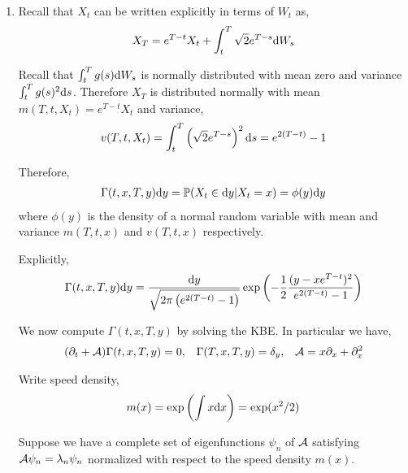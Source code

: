 \begin{solution}[Solution]
\begin{enumerate}[label=(\alph*)]
    \item Recall that \( X_t \) can be written explicitly in terms of \( W_t \) as,
        \begin{align*}
            X_T = e^{T-t} X_t + \int_t^T \sqrt{2}e^{T-s} \d W_s %
        \end{align*}

        
        Recall that \( \int_t^T g(s)\mathrm{d} W_s \) is normally distributed with mean zero and variance \( \int_t^T g(s)^2 \mathrm{d} s \).
        Therefore \( X_T \) is distributed normally with mean \( m(T,t,X_t) = e^{T-t}X_t \) and variance,
        \begin{align*}
            v(T,t,X_t) = \int_t^T \left( \sqrt{2} e^{T-s} \right)^2\mathrm{d} s = e^{2(T-t)}-1
        \end{align*}
        

        Therefore,
        \begin{align*}
            \Gamma(t,x,T,y)\mathrm{d} y = \mathbb{P}(X_t\in\mathrm{d} y | X_t = x) = \phi(y)\mathrm{d} y
        \end{align*}
        where \( \phi(y) \) is the density of a normal random variable with mean and variance \( m(T,t,x) \) and \( v(T,t,x) \) respectively.
        
        Explicitly,
        \begin{align*}
            \Gamma(t,x,T,y)\mathrm{d} y = \frac{\mathrm{d} y}{ \sqrt{2\pi\left( e^{2(T-t)}-1 \right)}} \exp \left( - \frac{1}{2} \frac{ (y-xe^{T-t})^2}{ e^{2(T-t)}-1}  \right)
        \end{align*}
        
        \hrulefill

        We now compute \( \Gamma(t,x,T,y) \) by solving the KBE. In particular we have,
        \begin{align*}
            (\partial_t + \mathcal{A}) \Gamma(t,x,T,y) = 0, && \Gamma(T,x,T,y) = \delta_y, && \mathcal{A} = x\partial_x + \partial_x^2
        \end{align*}

        Write speed density,
        \begin{align*}
            m(x) = \exp \left( \int x \mathrm{d} x \right) = \exp(x^2/2)
        \end{align*}
        

        Suppose we have a complete set of eigenfunctions \( \psi_n \) of \( \mathcal{A} \) satisfying \( \mathcal{A} \psi_n = \lambda_n\psi_n \) normalized with respect to the speed density \( m(x) \).


\end{enumerate}
\end{solution}

